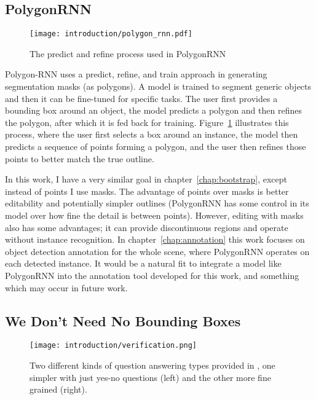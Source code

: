 \subsection {PolygonRNN \cite{Castrejon2017}}

\begin{figure}[h]
  \centering
  \texttt{[image: introduction/polygon\_rnn.pdf]}
  \caption{The predict and refine process used in PolygonRNN \cite{Castrejon2017}}  
  \label{fig:polygon_rnn}
\end{figure}


Polygon-RNN \cite{Castrejon2017} uses a predict, refine, and train approach in generating segmentation masks (as polygons). A model is trained to segment generic objects and then it can be fine-tuned for specific tasks. The user first provides a bounding box around an object, the model predicts a polygon and then refines the polygon,  after which it is fed back for training. Figure~\ref{fig:polygon_rnn} illustrates this process, where the user first selects a box around an instance, the model then predicts a sequence of points forming a polygon, and the user then refines those points to better match the true outline.

In this work, I have a very similar goal in chapter~\ref{chap:bootstrap}, except instead of points I use masks. The advantage of points over masks is better editability and potentially simpler outlines (PolygonRNN has some control in its model over how fine the detail is between points). However, editing with masks also has some advantages; it can provide discontinuous regions and operate without instance recognition. In chapter~\ref{chap:annotation} this work focuses on object detection annotation for the whole scene, where PolygonRNN operates on each detected instance. It would be a natural fit to integrate a model like PolygonRNN into the annotation tool developed for this work, and something which may occur in future work.


\subsection {We Don't Need No Bounding Boxes}

\begin{figure}[h]
  \centering
  \texttt{[image: introduction/verification.png]}
  \caption{Two different kinds of question answering types provided in \cite{Papadopoulos2016}, one simpler with just yes-no questions (left) and the other more fine grained (right).}
  \label{fig:verification}
\end{figure}

